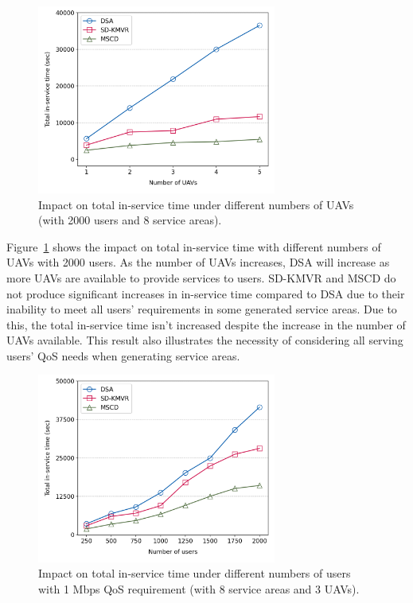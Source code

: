 \documentclass[a4paper,12pt]{report}
\begin{document}
\paragraph{}
\begin{figure} [h!]
    \centering
    \includegraphics[width=0.7\textwidth]{Figure 11.png}
    \caption{Impact on total in-service time under different numbers of UAVs (with 2000 users and 8 service areas).}
    \label{fig:Impact on total in-service time with different numbers of UAVs}
\end{figure}
Figure~\ref{fig:Impact on total in-service time with different numbers of UAVs} shows the impact on total in-service time with different numbers of UAVs with 2000 users. As the number of UAVs increases, DSA will increase as more UAVs are available to provide services to users. SD-KMVR and MSCD do not produce significant increases in in-service time compared to DSA due to their inability to meet all users' requirements in some generated service areas. Due to this, the total in-service time isn't increased despite the increase in the number of UAVs available. This result also illustrates the necessity of considering all serving users' QoS needs when generating service areas.

\begin{figure} [h!]
    \centering
    \includegraphics[width=0.7\textwidth]{Figure 12.png}
    \caption{Impact on total in-service time under different numbers of users with 1 Mbps QoS requirement (with 8 service areas and 3 UAVs).}
    \label{fig:Impact on total in-service time under different numbers of users with 1 Mbps QoS requirement}
\end{figure}
\end{document}
